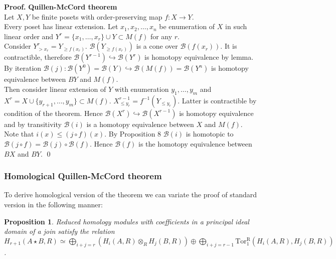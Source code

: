 \documentclass[a4paper, 12pt]{article}
\newtheorem{proposition}{Proposition}
\theoremstyle{definition}
\theoremstyle{remark}
\newenvironment{pf}{\noindent\textbf{Proof.}}{\qed}
\renewcommand{\leq}{\leqslant}
\renewcommand{\geq}{\geqslant}
\begin{document}
\begin{pf} \textbf{Quillen-McCord theorem}\\
  Let $X, Y$ be finite posets with order-preserving map $f : X \to Y$.\\

  Every poset has linear extension. Let $x_1, x_2, \ldots, x_n$ be enumeration of $X$ in such linear order and $Y^r = \{x_1,\ldots,x_r\} \cup Y \subset M(f)$ for any $r$.\\

  Consider $Y^r_{>x_r} = Y_{\geq f(x_r)}$. $\mathcal{B}(Y_{\geq f(x_r)})$ is a cone over $\mathcal{B}(f(x_r))$. It is contractible, therefore $\mathcal{B}(Y^{r-1}) \hookrightarrow \mathcal{B}(Y^{r})$ is homotopy equivalence by lemma. By iteration $\mathcal{B}(j) : \mathcal{B}(Y^{0}) = \mathcal{B}(Y) \hookrightarrow \mathcal{B}(M(f)) = \mathcal{B}(Y^n)$ is homotopy equivalence between $BY$ and $M(f)$.\\

  Then consider linear extension of $Y$ with enumeration $y_1,\ldots,y_m$ and $X^r = X \cup \{y_{r+1},\ldots,y_m\} \subset M(f)$. $X^{r-1}_{\leq y_r} = f^{-1}(Y_{\leqslant y_r})$. Latter is contractible by condition of the theorem. Hence $\mathcal{B}(X^{r}) \hookrightarrow \mathcal{B}(X^{r-1})$ is homotopy equivalence and by transitivity $\mathcal{B}(i)$ is a homotopy equivalence between $X$ and $M(f)$.\\

  Note that $i(x) \leqslant (j \circ f)(x)$. By Proposition 8 $\mathcal{B}(i)$ is homotopic to $\mathcal{B}(j \circ f) = \mathcal{B}(j) \circ \mathcal{B}(f)$. Hence $\mathcal{B}(f)$ is the homotopy equivalence between $BX$ and $BY$.
\end{pf}

\subsubsection{Homological Quillen-McCord theorem}

To derive homological version of the theorem we can variate the proof of standard version in the following manner:\\

\begin{proposition} {\cite[Lemma 2.1]{Milnor56}}
  Reduced homology modules with coefficients in a principal ideal domain of a join satisfy the relation
  $H_{r+1}(A \star B, R) \simeq \bigoplus_{i+j=r}(H_i(A,R) \otimes_R H_j(B,R)) \oplus \bigoplus_{i+j=r-1} \operatorname{Tor_1^R}(H_i(A,R),H_j(B,R))$.
\end{proposition}
\end{document}
